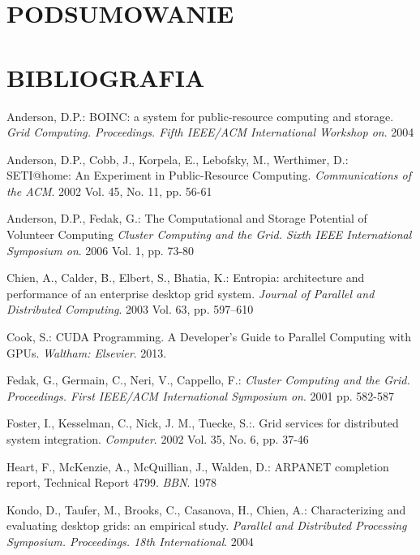 \documentclass[12pt,a4paper,twoside]{article}
\begin{document}
\section{PODSUMOWANIE}


\newpage

\section{BIBLIOGRAFIA}

\begingroup
\renewcommand{\section}[2]{}%
\begin{thebibliography}{99}

 Anderson, D.P.: BOINC: a system for public-resource computing and storage. \textit{Grid Computing. Proceedings. Fifth IEEE/ACM International Workshop on}. 2004

 Anderson, D.P., Cobb, J., Korpela, E., Lebofsky, M., Werthimer, D.: SETI@home: An Experiment in Public-Resource Computing. \textit{Communications of the ACM}. 2002 Vol. 45, No. 11, pp. 56-61

 Anderson, D.P., Fedak, G.: The Computational and Storage Potential of Volunteer Computing \textit{Cluster Computing and the Grid. Sixth IEEE International Symposium on}. 2006 Vol. 1, pp. 73-80

 Chien, A., Calder, B., Elbert, S., Bhatia, K.: Entropia: architecture and performance of an enterprise desktop grid system. \textit{Journal of Parallel and Distributed Computing}. 2003 Vol. 63, pp. 597–610

 Cook, S.: CUDA Programming. A Developer’s Guide to Parallel Computing with GPUs. \textit{Waltham: Elsevier}. 2013.

 Fedak, G., Germain, C., Neri, V., Cappello, F.: \textit{Cluster Computing and the Grid. Proceedings. First IEEE/ACM International Symposium on}. 2001 pp. 582-587

 Foster, I., Kesselman, C., Nick, J. M., Tuecke, S.:. Grid services for distributed system integration. \textit{Computer}. 2002 Vol. 35, No. 6, pp. 37-46

 Heart, F., McKenzie, A., McQuillian, J., Walden, D.: ARPANET completion report, Technical Report 4799. \textit{BBN}. 1978

 Kondo, D., Taufer, M., Brooks, C., Casanova, H., Chien, A.: Characterizing and evaluating desktop grids: an empirical study. \textit{Parallel and Distributed Processing Symposium. Proceedings. 18th International}. 2004


\end{thebibliography}
\end{document}
